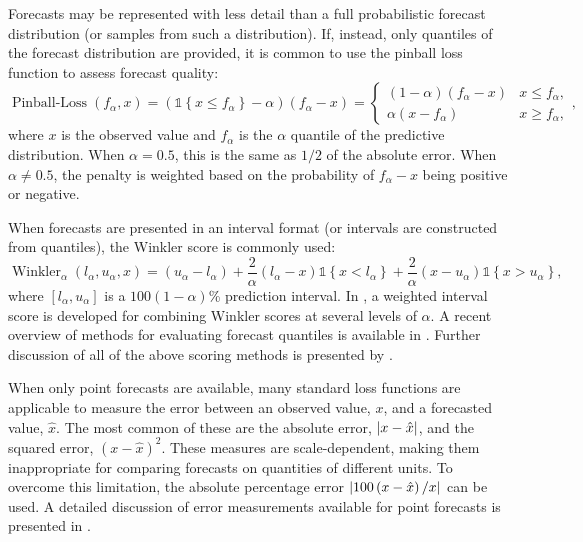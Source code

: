 Forecasts may be represented with less detail than a full probabilistic forecast distribution (or samples from such a distribution).
If, instead, only quantiles of the forecast distribution are provided, it is common to use the pinball loss function  to assess forecast quality:
\begin{equation}
    \operatorname{Pinball-Loss}(f_\alpha, x) = \left( \mathds{1} \left\{ x \leq f_\alpha \right\} - \alpha \right) \left( f_\alpha - x \right) =
    \begin{cases}
    \left( 1 - \alpha \right) \left( f_\alpha - x \right)   &   x \leq f_\alpha,\\
    \alpha \left( x - f_\alpha \right)  &   x \geq f_\alpha,
    \end{cases},
    \label{ch_2:eqn:pinball_loss}
\end{equation}
where \( x \) is the observed value and \( f_\alpha \) is the \( \alpha \) quantile of the predictive distribution.
When \( \alpha = 0.5 \), this is the same as \( 1 / 2  \) of the absolute error.
When \( \alpha \neq 0.5 \), the penalty is weighted based on the probability of \( f_\alpha - x \) being positive or negative.

When forecasts are presented in an interval format (or intervals are constructed from quantiles), the Winkler score is commonly used:
\begin{equation}
    \operatorname{Winkler}_\alpha \left( l_\alpha, u_\alpha, x \right) = \left( u_\alpha - l_\alpha \right) + \frac{2}{\alpha} \left( l_\alpha - x \right) \mathds{1} \left\{ x < l_\alpha \right\} + \frac{2}{\alpha} \left( x - u_\alpha \right) \mathds{1} \left\{ x > u_\alpha \right\},
\end{equation}
where \( \left[ l_\alpha, u_\alpha \right] \) is a \( 100 (1 - \alpha) \)\% prediction interval.
In \citep{Bracher2021Evaluating}, a weighted interval score is developed for combining Winkler scores at several levels of \( \alpha \).
A recent overview of methods for evaluating forecast quantiles is available in \citep{Gneiting2023Model}.
Further discussion of all of the above scoring methods is presented by \citet{gneiting2007strictly}.

When only point forecasts are available, many standard loss functions are applicable to measure the error between an observed value, \( x \), and a forecasted value, \( \hat{x} \).
The most common of these are the absolute error, \( \abs{x - \hat{x}} \), and the squared error, \( \left( x - \hat{x} \right)^2 \).
These measures are scale-dependent, making them inappropriate for comparing forecasts on quantities of different units.
To overcome this limitation, the absolute percentage error \( \abs{100 \left( x - \hat{x} \right)/ x} \) can be used.
A detailed discussion of error measurements available for point forecasts is presented in \citep{Hyndman2006Another}.

